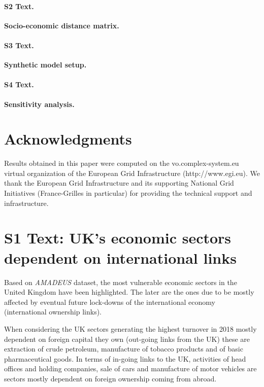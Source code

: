 \documentclass[10pt,letterpaper]{article}
\begin{document}
\paragraph*{S2 Text.}
\label{S2_Text}
{\bf Socio-economic distance matrix.}


\paragraph*{S3 Text.}
\label{S3_Text}
{\bf Synthetic model setup.}

\paragraph*{S4 Text.}
\label{S4_Text}
{\bf Sensitivity analysis.}


\section*{Acknowledgments}

Results obtained in this paper were computed on the vo.complex-system.eu virtual organization of the European Grid Infrastructure (http://www.egi.eu). We thank the European Grid Infrastructure and its supporting National Grid Initiatives (France-Grilles in particular) for providing the technical support and infrastructure.






\newpage
\section*{S1 Text: UK's economic sectors dependent on international links}


Based on \emph {AMADEUS} dataset, the most vulnerable economic sectors in the United Kingdom have been highlighted. The later are the ones due to be mostly affected by eventual future lock-downs of the international economy (international ownership links). 

When considering the UK sectors generating the highest turnover in 2018 mostly dependent on foreign capital they own (out-going links from the UK) these are extraction of crude petroleum, manufacture of tobacco products and of basic pharmaceutical goods. In terms of in-going links to the UK, activities of head offices and holding companies, sale of cars and manufacture of motor vehicles are sectors mostly dependent on foreign ownership coming from abroad.
\end{document}
